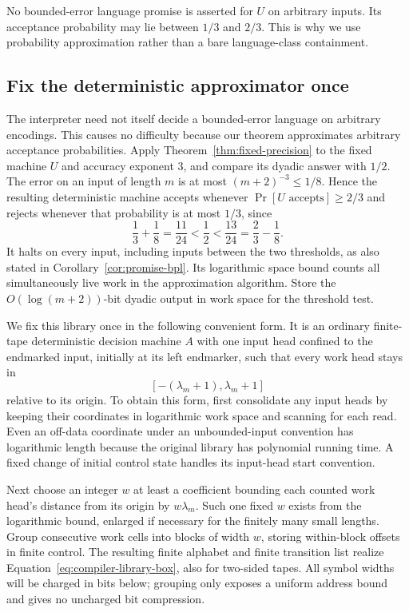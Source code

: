 No bounded-error language promise is asserted for $U$ on arbitrary
inputs.  Its acceptance probability may lie between $1/3$ and $2/3$.
This is why we use probability approximation rather than a bare
language-class containment.

\subsection{Fix the deterministic approximator once}
\label{subsec:compiler-library}

The interpreter need not itself decide a bounded-error language on arbitrary encodings. This causes no difficulty because our theorem approximates arbitrary acceptance probabilities. Apply Theorem~\ref{thm:fixed-precision} to the fixed machine $U$ and
accuracy exponent $3$, and compare its dyadic answer with $1/2$.
The error on an input of length $m$ is at most
$(m+2)^{-3}\le1/8$.  Hence the resulting deterministic machine accepts
whenever $\Pr[U\text{ accepts}]\ge2/3$ and rejects whenever that
probability is at most $1/3$, since
\[
 \frac13+\frac18=\frac{11}{24}<\frac12
   <\frac{13}{24}=\frac23-\frac18.
\]
It halts on every input, including inputs between the two thresholds,
as also stated in Corollary~\ref{cor:promise-bpl}.  Its logarithmic
space bound counts all simultaneously live work in the approximation
algorithm.  Store the $O(\log(m+2))$-bit dyadic output in work space
for the threshold test.

We fix this library once in the following convenient form.  It is an
ordinary finite-tape deterministic decision machine $A$ with one input
head confined to the endmarked input, initially at its left endmarker,
such that every work head stays in
\begin{equation}\label{eq:compiler-library-box}
 [-(\lambda_m+1),\lambda_m+1]
\end{equation}
relative to its origin.  To obtain this form, first consolidate any
input heads by keeping their coordinates in logarithmic work space
and scanning for each read.  Even an off-data coordinate under an
unbounded-input convention has logarithmic length because the original
library has polynomial running time.  A fixed change of initial control
state handles its input-head start convention.

Next choose an integer $w$ at least a coefficient bounding each counted
work head's distance from its origin by $w\lambda_m$.  Such one fixed
$w$ exists from the logarithmic bound, enlarged if necessary for the
finitely many small lengths.  Group consecutive work cells into blocks
of width $w$, storing within-block offsets in finite control.  The
resulting finite alphabet and finite transition list realize
Equation~\eqref{eq:compiler-library-box}, also for two-sided tapes.
All symbol widths will be charged in bits below; grouping only exposes
a uniform address bound and gives no uncharged bit compression.

